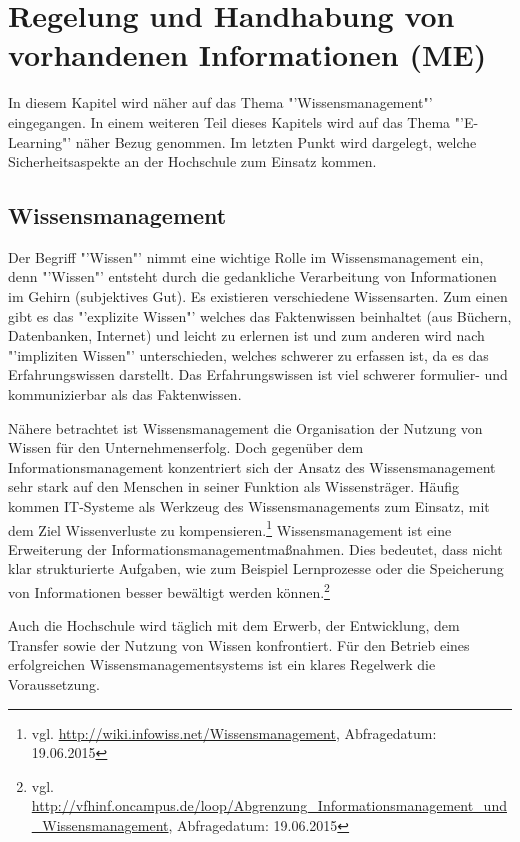 \section{Regelung und Handhabung von vorhandenen Informationen (ME)}

In diesem Kapitel wird näher auf das Thema "'Wissensmanagement"' eingegangen. In einem weiteren Teil dieses Kapitels wird auf das Thema "'E-Learning"' näher Bezug genommen. Im letzten Punkt wird dargelegt, welche Sicherheitsaspekte an der Hochschule zum Einsatz kommen.

\subsection{Wissensmanagement}

Der Begriff "'Wissen"' nimmt eine wichtige Rolle im Wissensmanagement ein, denn "'Wissen"' entsteht durch die gedankliche Verarbeitung von Informationen im Gehirn (subjektives Gut). Es existieren verschiedene Wissensarten. Zum einen gibt es das "'explizite Wissen"' welches das Faktenwissen beinhaltet (aus Büchern, Datenbanken, Internet) und leicht zu erlernen ist und zum anderen wird nach "'impliziten Wissen"' unterschieden, welches schwerer zu erfassen ist, da es das Erfahrungswissen darstellt. Das Erfahrungswissen ist viel schwerer formulier- und kommunizierbar als das Faktenwissen. 

Nähere betrachtet ist Wissensmanagement die Organisation der Nutzung von Wissen für den Unternehmenserfolg. Doch gegenüber dem Informationsmanagement konzentriert sich der Ansatz des Wissensmanagement sehr stark auf den Menschen in seiner Funktion als Wissensträger. Häufig kommen IT-Systeme als Werkzeug des Wissensmanagements zum Einsatz, mit dem Ziel Wissenverluste zu kompensieren.\footnote{vgl. \url{http://wiki.infowiss.net/Wissensmanagement}, Abfragedatum: 19.06.2015}  Wissensmanagement ist eine Erweiterung der Informationsmanagementmaßnahmen. Dies bedeutet, dass nicht klar strukturierte Aufgaben, wie zum Beispiel Lernprozesse oder die Speicherung von Informationen besser bewältigt werden können.\footnote{vgl. \url{http://vfhinf.oncampus.de/loop/Abgrenzung_Informationsmanagement_und_Wissensmanagement}, Abfragedatum: 19.06.2015} 

Auch die Hochschule wird täglich mit dem Erwerb, der Entwicklung, dem Transfer sowie der Nutzung von Wissen konfrontiert. Für den Betrieb eines erfolgreichen Wissensmanagementsystems ist ein klares Regelwerk die Voraussetzung. 

